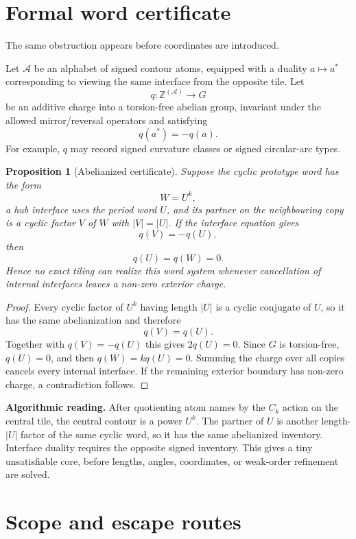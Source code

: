 \documentclass[11pt]{article}
\newtheorem{proposition}[theorem]{Proposition}
\theoremstyle{definition}
\theoremstyle{remark}
\begin{document}
\section{Formal word certificate}

The same obstruction appears before coordinates are introduced.

Let $\mathcal A$ be an alphabet of signed contour atoms, equipped with a duality $a\mapsto a^*$ corresponding to viewing the same interface from the opposite tile.  Let
\[
  q:\mathbb Z^{(\mathcal A)}\longrightarrow G
\]
be an additive charge into a torsion-free abelian group, invariant under the allowed mirror/reversal operators and satisfying
\[
  q(a^*)=-q(a).
\]
For example, $q$ may record signed curvature classes or signed circular-arc types.

\begin{proposition}[Abelianized certificate]\label{prop:word}
Suppose the cyclic prototype word has the form
\[
  W=U^k,
\]
a hub interface uses the period word $U$, and its partner on the neighbouring copy is a cyclic factor $V$ of $W$ with $|V|=|U|$.  If the interface equation gives
\[
  q(V)=-q(U),
\]
then
\[
  q(U)=q(W)=0.
\]
Hence no exact tiling can realize this word system whenever cancellation of internal interfaces leaves a non-zero exterior charge.
\end{proposition}

\begin{proof}
Every cyclic factor of $U^k$ having length $|U|$ is a cyclic conjugate of $U$, so it has the same abelianization and therefore
\[
  q(V)=q(U).
\]
Together with $q(V)=-q(U)$ this gives $2q(U)=0$.  Since $G$ is torsion-free, $q(U)=0$, and then $q(W)=kq(U)=0$.  Summing the charge over all copies cancels every internal interface.  If the remaining exterior boundary has non-zero charge, a contradiction follows.
\end{proof}

\begin{plainbox}[boxgreen]
\textbf{Algorithmic reading.}
After quotienting atom names by the $C_k$ action on the central tile, the central contour is a power $U^k$.  The partner of $U$ is another length-$|U|$ factor of the same cyclic word, so it has the same abelianized inventory.  Interface duality requires the opposite signed inventory.  This gives a tiny unsatisfiable core, before lengths, angles, coordinates, or weak-order refinement are solved.
\end{plainbox}

\section{Scope and escape routes}
\end{document}
